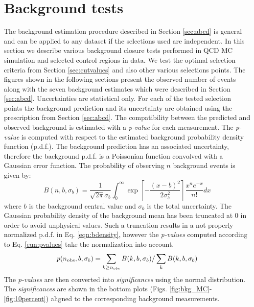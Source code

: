\section{Background tests}
\label{sec:backgroundtests}
The background estimation procedure described in Section \ref{sec:abcd} is general and can be applied
to any dataset if the selections used are independent.
In this section we describe various background closure tests
 performed in QCD MC simulation and 
selected control regions in data.
We test the optimal selection criteria from Section \ref{sec:cutvalues} and also other various selections points.
The figures shown in the following sections present the observed number
of events along with the seven background estimates which were described
 in Section \ref{sec:abcd}.
Uncertainties are statistical only. 
For each of the tested selection points the background prediction 
and its uncertainty are obtained 
using the prescription from Section \ref{sec:abcd}. 
The compatibility between the predicted and observed background is estimated with a {\it p-value} for each measurement. 
 The {\it p-value}
is computed with respect to the estimated background probability density function (p.d.f.). 
The background prediction has an associated uncertainty, 
therefore the background p.d.f. is a Poissonian function convolved  
with a Gaussian error function. The probability of observing $n$ background events is given by:
\begin{equation}
B(n,b,\sigma_b)= \frac{1}{\sqrt{2\pi}\sigma_b} \int_{0}^{\infty} 
\exp\left[ -\frac{\left(x-b\right)^2}{2\sigma_b^2}\right]\frac{x^n e^{-x}}{n!}dx
\label{eqn:bdensity}
\end{equation}
where $b$ is the background central value and $\sigma_b$ is the total uncertainty.
The Gaussian probability density of the background mean has been truncated at 
0 in order to avoid unphysical values. Such a truncation results in a not properly normalized p.d.f. in Eq. 
\ref{eqn:bdensity}, however the {\it p-values} computed according to Eq. \ref{eqn:pvalues} take the 
normalization into account.   
\begin{equation}
{\it p} (n_\text{obs},b,\sigma_b) = \sum_{k\geq n_{obs}} B(k,b,\sigma_b) / \sum_{k} B(k,b,\sigma_b)
\label{eqn:pvalues}
\end{equation}
The {\it p-values} are then converted into {\it significances} using the normal
 distribution. The {\it significances} are shown in the bottom plots (Figs. 
\ref{fig:bkg_MC}-\ref{fig:10percent}) aligned to the corresponding background
measurements.  

